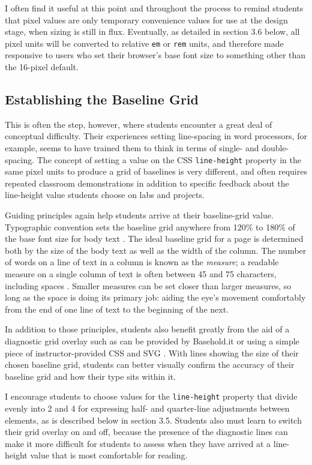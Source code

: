 \documentclass[sigplan,screen]{acmart}
\begin{document}
I often find it useful at this point and throughout the process to remind students that pixel values are only temporary convenience values for use at the design stage, when sizing is still in flux. Eventually, as detailed in section 3.6 below, all pixel units will be converted to relative \verb|em| or \verb|rem| units, and therefore made responsive to users who set their browser's base font size to something other than the 16-pixel default.

\subsection{Establishing the Baseline Grid}

This is often the step, however, where students encounter a great deal of conceptual difficulty. Their experiences setting line-spacing in word processors, for example, seems to have trained them to think in terms of single- and double-spacing. The concept of setting a value on the CSS \verb|line-height| property in the same pixel units to produce a grid of baselines is very different, and often requires repeated classroom demonstrations in addition to specific feedback about the line-height value students choose on labs and projects.

Guiding principles again help students arrive at their baseline-grid value. Typographic convention sets the baseline grid anywhere from 120\% to 180\% of the base font size for body text \cite[p.~92]{jsm:owt}. The ideal baseline grid for a page is determined both by the size of the body text as well as the width of the column. The number of words on a line of text in a column is known as the {\itshape measure}; a readable measure on a single column of text is often between 45 and 75 characters, including spaces \cite[pp. 26–27]{rb:style}. Smaller measures can be set closer than larger measures, so long as the space is doing its primary job: aiding the eye's movement comfortably from the end of one line of text to the beginning of the next.

In addition to those principles, students also benefit greatly from the aid of a diagnostic grid overlay such as can be provided by Basehold.it or using a simple piece of instructor-provided CSS and SVG \cite{basehold}. With lines showing the size of their chosen baseline grid, students can better visually confirm the accuracy of their baseline grid and how their type sits within it.

I encourage students to choose values for the \verb|line-height| property that divide evenly into 2 and 4 for expressing half- and quarter-line adjustments between elements, as is described below in section 3.5. Students also must learn to switch their grid overlay on and off, because the presence of the diagnostic lines can make it more difficult for students to assess when they have arrived at a line-height value that is most comfortable for reading.
\end{document}
